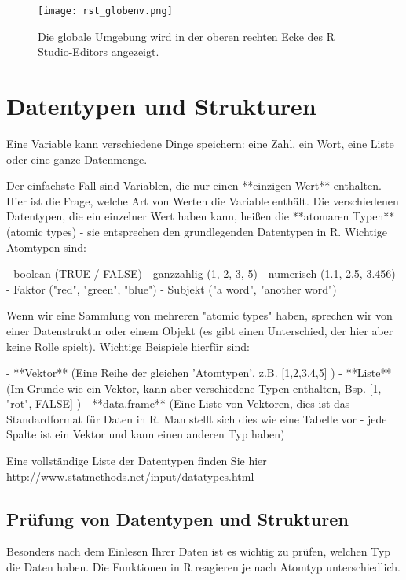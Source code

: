 \documentclass[a4paper,twoside]{tufte-book}\usepackage[]{graphicx}\usepackage[]{color}
\begin{document}
\begin{Anhang}
\begin{figure}[]
\begin{center}
\texttt{[image: rst\_globenv.png]}
\caption{Die globale Umgebung wird in der oberen rechten Ecke des R Studio-Editors angezeigt.}
\label{fig: Rstudio}
\end{center}
\end{figure}

\section{Datentypen und Strukturen}

Eine Variable kann verschiedene Dinge speichern: eine Zahl, ein Wort, eine Liste oder eine ganze Datenmenge.

Der einfachste Fall sind Variablen, die nur einen **einzigen Wert** enthalten. Hier ist die Frage, welche Art von Werten die Variable enthält. Die verschiedenen Datentypen, die ein einzelner Wert haben kann, heißen die **atomaren Typen** (atomic types) - sie entsprechen den grundlegenden Datentypen in R. Wichtige Atomtypen sind:

- boolean (TRUE / FALSE)
- ganzzahlig (1, 2, 3, 5)
- numerisch (1.1, 2.5, 3.456)
- Faktor ("red", "green", "blue")
- Subjekt ("a word", "another word")

Wenn wir eine Sammlung von mehreren "atomic types" haben, sprechen wir von einer Datenstruktur oder einem Objekt (es gibt einen Unterschied, der hier aber keine Rolle spielt). Wichtige Beispiele hierfür sind:

- **Vektor** (Eine Reihe der gleichen 'Atomtypen', z.B. [1,2,3,4,5] )
- **Liste** (Im Grunde wie ein Vektor, kann aber verschiedene Typen enthalten, Bsp. [1, "rot", FALSE] )
- **data.frame** (Eine Liste von Vektoren, dies ist das Standardformat für Daten in R. Man stellt sich dies wie eine Tabelle vor - jede Spalte ist ein Vektor und kann einen anderen Typ haben)

Eine vollständige Liste der Datentypen finden Sie hier http://www.statmethods.net/input/datatypes.html 
 
\subsection{Prüfung von Datentypen und Strukturen}

Besonders nach dem Einlesen Ihrer Daten ist es wichtig zu prüfen, welchen Typ die Daten haben. Die Funktionen in R reagieren je nach Atomtyp unterschiedlich.


\end{Anhang}
\end{document}
